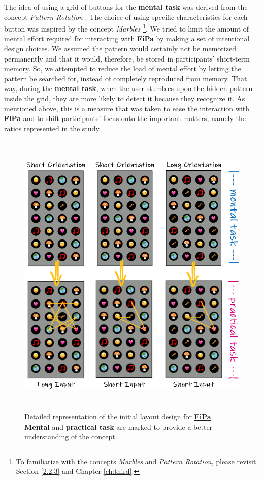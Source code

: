 The idea of using a grid of buttons for the \textbf{mental task} was derived from the concept \textit{Pattern Rotation} \cite{Marbles, Zezschwitz}. The choice of using specific characteristics for each button was inspired by the concept \textit{Marbles} \cite{Marbles, Zezschwitz}\footnote{To familiarize with the concepts \textit{Marbles} and \textit{Pattern Rotation}, please revisit Section \ref{2.2.3} and Chapter \ref{ch:third}.}. We tried to limit the amount of mental effort required for interacting with \underline{\textbf{FiPa}} by making a set of intentional design choices. We assumed the pattern would certainly not be memorized permanently and that it would, therefore, be stored in participants' short-term memory. So, we attempted to reduce the load of mental effort by letting the pattern be searched for, instead of completely reproduced from memory. That way, during the \textbf{mental task}, when the user stumbles upon the hidden pattern inside the grid, they are more likely to detect it because they recognize it. As mentioned above, this is a measure that was taken to ease the interaction with \underline{\textbf{FiPa}} and to shift participants' focus onto the important matters, namely the ratios represented in the study.

\begin{figure}[t!]
\centering
\includegraphics[width=14cm, height=14cm]{Chapters/graphics/firstdraft.PNG}
\caption{Detailed representation of the initial layout design for \underline{\textbf{FiPa}}. \textbf{Mental} and \textbf{practical task} are marked to provide a better understanding of the concept.}
\label{fig:firstdraft}
\end{figure}

